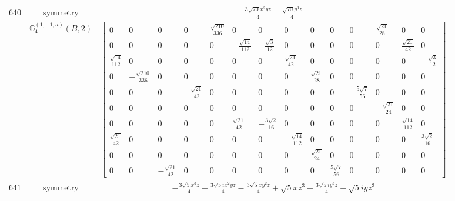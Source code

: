 \documentclass[fleqn,8pt,landscape]{jsarticle}
\begin{document}
\begin{longtable}{ccc}
$ 640 $ & $ \text{symmetry} $ & $ \frac{3 \sqrt{70} x^{2} y z}{4} - \frac{\sqrt{70} y^{3} z}{4} $ \\
$  $ & $ \mathbb{G}_{4}^{(1,-1;a)}(B,2) $ & $ \begin{bmatrix} 0 & 0 & 0 & 0 & \frac{\sqrt{210}}{336} & 0 & 0 & 0 & 0 & 0 & 0 & \frac{\sqrt{21}}{28} & 0 & 0 \\ 0 & 0 & 0 & 0 & 0 & - \frac{\sqrt{14}}{112} & - \frac{\sqrt{3}}{12} & 0 & 0 & 0 & 0 & 0 & \frac{\sqrt{21}}{42} & 0 \\ \frac{\sqrt{14}}{112} & 0 & 0 & 0 & 0 & 0 & 0 & \frac{\sqrt{21}}{42} & 0 & 0 & 0 & 0 & 0 & - \frac{\sqrt{3}}{12} \\ 0 & - \frac{\sqrt{210}}{336} & 0 & 0 & 0 & 0 & 0 & 0 & \frac{\sqrt{21}}{28} & 0 & 0 & 0 & 0 & 0 \\ 0 & 0 & 0 & - \frac{\sqrt{21}}{42} & 0 & 0 & 0 & 0 & 0 & 0 & - \frac{5 \sqrt{7}}{56} & 0 & 0 & 0 \\ 0 & 0 & 0 & 0 & 0 & 0 & 0 & 0 & 0 & 0 & 0 & - \frac{\sqrt{21}}{24} & 0 & 0 \\ 0 & 0 & 0 & 0 & 0 & \frac{\sqrt{21}}{42} & - \frac{3 \sqrt{2}}{16} & 0 & 0 & 0 & 0 & 0 & \frac{\sqrt{14}}{112} & 0 \\ \frac{\sqrt{21}}{42} & 0 & 0 & 0 & 0 & 0 & 0 & - \frac{\sqrt{14}}{112} & 0 & 0 & 0 & 0 & 0 & \frac{3 \sqrt{2}}{16} \\ 0 & 0 & 0 & 0 & 0 & 0 & 0 & 0 & \frac{\sqrt{21}}{24} & 0 & 0 & 0 & 0 & 0 \\ 0 & 0 & - \frac{\sqrt{21}}{42} & 0 & 0 & 0 & 0 & 0 & 0 & \frac{5 \sqrt{7}}{56} & 0 & 0 & 0 & 0 \end{bmatrix} $ \\ \hline
$ 641 $ & $ \text{symmetry} $ & $ - \frac{3 \sqrt{5} x^{3} z}{4} - \frac{3 \sqrt{5} i x^{2} y z}{4} - \frac{3 \sqrt{5} x y^{2} z}{4} + \sqrt{5} x z^{3} - \frac{3 \sqrt{5} i y^{3} z}{4} + \sqrt{5} i y z^{3} $ \\

\end{longtable}
\end{document}
